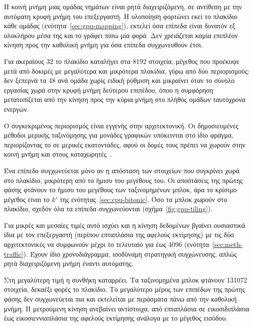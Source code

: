 Η κοινή μνήμη μιας ομάδας νημάτων είναι ρητά διαχειριζόμενη, σε αντίθεση με την
αυτόματη κρυφή μνήμη του επεξεργαστή. Η υλοποίηση φορτώνει εκεί το πλακίδιο
κάθε ομάδας (ενότητα~\ref{sec:gpu-mapping}), εκτελεί όσα επίπεδα είναι δυνατόν
εξ ολοκλήρου μέσα της και το γράφει πίσω μία φορά. Δεν χρειάζεται καμία
επιπλέον κίνηση προς την καθολική μνήμη για όσα επίπεδα συγχωνευθούν έτσι.

Για ακεραίους 32  το πλακίδιο καταλήγει στα 8192 στοιχεία, μέγεθος που
προέκυψε μετά από δοκιμές με μεγαλύτερα και μικρότερα πλακίδια, γύρω από δύο
περιορισμούς: δεν ξεπερνά τα 48  ανά ομάδα χωρίς ειδική ρύθμιση και
μικραίνει όταν το σύνολο εργασίας χωρά στην κρυφή μνήμη δεύτερου επιπέδου, όπου
η συμφόρηση μετατοπίζεται από την κίνηση προς την κύρια μνήμη στο πλήθος ομάδων
ταυτόχρονα ενεργών.

Ο συγκεκριμένος περιορισμός είναι εγγενής στην αρχιτεκτονική. Οι δημοσιευμένες
μέθοδοι μερικής ταξινόμησης για μονάδες γραφικών υπόκεινται στο ίδιο φράγμα,
περιορίζοντας το  σε μερικές εκατοντάδες, αφού οι δομές τους πρέπει να
χωρούν στην κοινή μνήμη και στους
καταχωρητές~\cite{shanbhag2018,zhang2023gputopk}.

Ένα επίπεδο συγχωνεύεται μόνο αν η απόσταση των στοιχείων που συγκρίνει χωρά
στο πλακίδιο, μικρότερη από το ήμισυ του μεγέθους του. Οι αποστάσεις της πρώτης
φάσης φτάνουν το ήμισυ του μεγέθους των ταξινομημένων μπλοκ, άρα το κρίσιμο
μέγεθος είναι το $k'$ της ενότητας~\ref{sec:cpu-bitonic}. Όσο τα μπλοκ χωρούν
στο πλακίδιο, σχεδόν όλα τα επίπεδα συγχωνεύονται (σχήμα~\ref{fig:gpu-tiling}).

Για μικρές και μεσαίες τιμές  αυτό ισχύει και η κίνηση δεδομένων βγαίνει
ουσιαστικά ίδια με τον επεξεργαστή (περίπου επταπλάσια της αφελούς εκτίμησης)
με τις δύο αρχιτεκτονικές να συμφωνούν μέχρι το τελευταίο  για 
έως 4096 (ενότητα~\ref{sec:meth-traffic}). Έχουν ίδιο χρονοδιάγραμμα, ισοδύναμη
στρατηγική συγχώνευσης, απλώς ρητά διαχειριζόμενη μνήμη έναντι αυτόματης.

Στη μεγαλύτερη τιμή  η συνθήκη καταρρέει. Τα ταξινομημένα μπλοκ φτάνουν
131072 στοιχεία, δεκαέξι φορές το πλακίδιο. Το μεγαλύτερο μέρος των επιπέδων
της πρώτης φάσης δεν συγχωνεύεται πια και εκτελείται με περάσματα πάνω από την
καθολική μνήμη. Η μετρούμενη κίνηση ανεβαίνει αντίστοιχα, από επταπλάσια σε
εικοσιδιπλάσια έως εικοσιεννιαπλάσια της αφελούς εκτίμησης ανάλογα με το
μέγεθος εισόδου.




